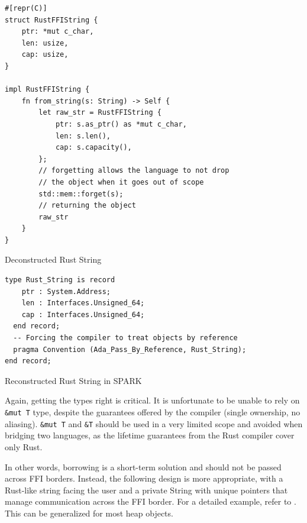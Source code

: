\documentclass[nomenclature, english, bibtex]{kththesis}
\begin{document}
{\begin{listing}[!ht]
\begin{verbatim}
#[repr(C)]
struct RustFFIString {
    ptr: *mut c_char,
    len: usize,
    cap: usize,
}

impl RustFFIString {
    fn from_string(s: String) -> Self {
        let raw_str = RustFFIString {
            ptr: s.as_ptr() as *mut c_char,
            len: s.len(),
            cap: s.capacity(),
        };
        // forgetting allows the language to not drop 
        // the object when it goes out of scope
        std::mem::forget(s);
        // returning the object
        raw_str
    }
}

\end{verbatim}
\caption[Deconstructed Rust String]{Deconstructed Rust String}
\label{lst:deconstructed_rust_string}
\end{listing}
\FloatBarrier

\begin{listing}[!ht]
\begin{verbatim}
type Rust_String is record
    ptr : System.Address;
    len : Interfaces.Unsigned_64;
    cap : Interfaces.Unsigned_64;
  end record;
  -- Forcing the compiler to treat objects by reference
  pragma Convention (Ada_Pass_By_Reference, Rust_String);
end record;
\end{verbatim}
\caption[Reconstructed Rust String]{Reconstructed Rust String in SPARK}
\label{lst:reconstructed_rust_string}
\end{listing}
\FloatBarrier

Again, getting the types right is critical. It is unfortunate to be unable to rely on \texttt{\&mut T} type, despite the guarantees offered by the compiler (single ownership, no aliasing). \texttt{\&mut T} and \texttt{\&T} should be used in a very limited scope and avoided when bridging two languages, as the lifetime guarantees from the Rust compiler cover only Rust. 

In other words, borrowing is a short-term solution and should not be passed across FFI borders. Instead, the following design  is more appropriate, with a Rust-like string facing the user and a private String with unique pointers that manage communication across the FFI border. For a detailed example, refer to .
This can be generalized for most heap objects.


}
\end{document}
